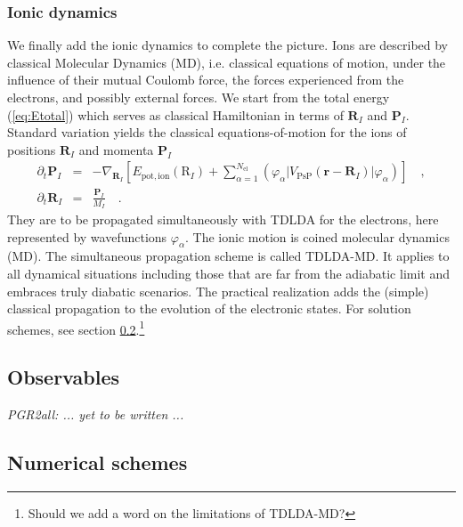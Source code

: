 \documentclass[final,1p]{elsarticle}
\newcommand{\PGRcomm}[1]{{\color{blue}\small\em PGR2all: #1}}
\newcommand{\PGRfoot}[1]{{\color{blue}\footnote{\color{blue} #1}}}
\begin{document}
\subsubsection{Ionic dynamics}
\label{sec:TDLDA-MD2}



We finally add the ionic dynamics to complete the picture. Ions are
described by classical Molecular Dynamics (MD), i.e.  classical
equations of motion, under the influence of their mutual Coulomb
force, the forces experienced from the electrons, and possibly
external forces.  We start from the total energy (\ref{eq:Etotal})
which serves as classical Hamiltonian in terms of $\mathbf{R}_I$ and
$\mathbf{P}_I$. Standard variation yields the classical
equations-of-motion for the ions of positions $\mathbf{R}_I$ and
momenta $\mathbf{P}_I$
\begin{subequations}
\label{eq:propion}
\begin{eqnarray}
  \partial_t\mathbf{P}_I
  &=&
  -\nabla_{\mathbf{R}_I}\left[
    E_\mathrm{pot,ion}(\mathrm{R}_I)
    +
    \sum_{\alpha=1}^{N_\mathrm{el}}
    \left(\varphi_\alpha|V_\mathrm{PsP}^{\mbox{}}(\mathbf{r}-\mathbf{R}_I)|
          \varphi_\alpha\right)
  \right]
  \quad,
\label{eq:propionP}
\\
  \partial_t\mathbf{R}_I
  &=&
  \frac{\mathbf{P}_I}{M_I}
  \quad.
\end{eqnarray}
\end{subequations}
They are to be propagated simultaneously with TDLDA for the electrons, here
represented by wavefunctions $\varphi_\alpha$.
The ionic motion is coined molecular dynamics (MD).
The simultaneous propagation scheme is called TDLDA-MD.
It applies to all dynamical situations including those that are
far from the adiabatic limit and embraces truly diabatic scenarios.
The practical realization adds the (simple) classical propagation
to the evolution of the electronic states. For solution schemes, see
section \ref{sec:numerics}.\PGRfoot{Should we add a word on the
limitations of TDLDA-MD?}

\subsection{Observables}
\label{sec:observ}

\centerline{\PGRcomm{... yet to be written ...}}


\subsection{Numerical schemes}
\label{sec:numerics}
\end{document}
